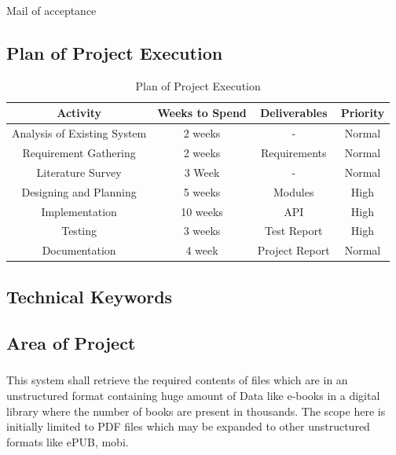 \documentclass[oneside,a4paper,12pt]{report}
\begin{document}
Mail of acceptance

\section{Plan of Project Execution}
\begin{table}[!htbp]
\begin{center}
\def\arraystretch{1.5}
  \begin{tabular}{| c | c | c | c |}
       \hline

	\textbf{Activity} & \textbf{Weeks to Spend} & \textbf{Deliverables} & \textbf{Priority}\\ \hline
	Analysis of Existing System & 2 weeks & - & Normal \\ \hline
	Requirement Gathering & 2 weeks & Requirements & Normal \\ \hline 
	Literature Survey & 3 Week & - & Normal \\ \hline
	Designing and Planning & 5 weeks & Modules & High \\ \hline
	Implementation & 10 weeks & API & High \\ \hline
	Testing & 3 weeks & Test Report & High \\ \hline
	Documentation & 4 week & Project Report & Normal \\ \hline
\end{tabular}
 \caption { Plan of Project Execution }
 \label{tab:hreq}
\end{center}

\end{table}


\begin{center}
\chapter{Technical Keywords}
\end{center}
\newpage
\section{Area of Project}
\paragraph{}
This  system  shall  retrieve  the  required  contents  of  files  which  are  in  an  unstructured  format containing huge amount of Data like e-books in a digital library where the number of books are present in thousands. The scope here is initially limited to PDF files which may be expanded to other unstructured formats like ePUB, mobi.
\end{document}
